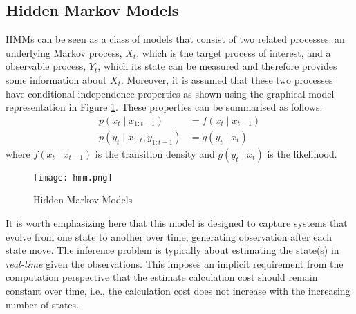 \subsection{Hidden Markov Models}
HMMs can be seen as a class of models that consist of two related processes: an underlying Markov process, $X_t$, which is the target process of interest, and a observable process, $Y_t$, which its state can be measured and therefore provides some information about $X_t$. Moreover, it is assumed that these two processes have conditional independence properties as shown using the graphical model representation in Figure \ref{fig:HMM}. These properties can be summarised as follows:
\begin{align}
   p(x_t \mid x_{1:t-1}) &= f(x_t \mid x_{t-1})   \nonumber \\
   p(y_t \mid x_{1:t}, y_{1:t-1}) &= g(y_t \mid x_{t}) 
\end{align}
where $f(x_t \mid x_{t-1})$ is the transition density and $g(y_t \mid x_t)$ is the likelihood. 
\begin{figure}
\centering
\texttt{[image: hmm.png]} 
\caption{Hidden Markov Models}
\label{fig:HMM}
\end{figure}
It is worth emphasizing here that this model is designed to capture systems that evolve from one state to another over time, generating observation after each state move. The inference problem is typically about estimating the state(s) in \emph{real-time} given the observations. This imposes an implicit requirement from the computation perspective that the estimate calculation cost should remain constant over time, i.e., the calculation cost does not increase with the increasing number of states.


